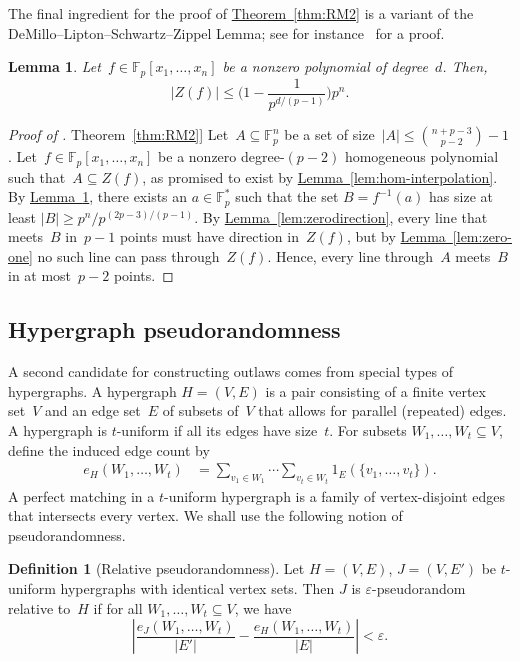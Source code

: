 \documentclass[11pt]{article}
\numberwithin{equation}{section}
\newtheorem{lemma}[theorem]{Lemma}
\theoremstyle{definition}
\newtheorem{definition}[theorem]{Definition}
\theoremstyle{plain}
\newcommand{\expref}[2]{\hyperref[#2]{#1~\ref{#2}}}
\newcommand{\eps}{\varepsilon}
\newcommand{\F}{{\mathbb{F}}}
\newcommand{\beq}{\begin{equation}}
\newcommand{\eeq}{\end{equation}}
\newcommand{\beqn}{\begin{equation*}}
\newcommand{\eeqn}{\end{equation*}}
\begin{document}
The final ingredient for the proof of \expref{Theorem}{thm:RM2} is a variant of the DeMillo--Lipton--Schwartz--Zippel Lemma; see for instance~\cite[Appendix~C]{CohenTal:2014} for a proof.

\begin{lemma}\label{lem:DMLSZ}
Let~$f\in\F_p[x_1,\dots,x_n]$ be a nonzero polynomial of degree~$d$.
Then,
\beqn
|Z(f)| \leq \Big(1 - \frac{1}{p^{d/(p-1)}}\Big)p^n.
\eeqn
\end{lemma}


\begin{proof}[Proof of \expref{Theorem}{thm:RM2}]
Let~$A\subseteq \F_p^n$ be a set of size~$|A|\leq \binom{n+p-3}{p-2}-1$.
Let~$f\in\F_p[x_1,\dots,x_n]$ be a nonzero degree-$(p-2)$ homogeneous polynomial such that~$A\subseteq Z(f)$, as promised to exist by \expref{Lemma}{lem:hom-interpolation}.
By \expref{Lemma}{lem:DMLSZ}, there exists an $a\in\F_p^*$ such that the set $B = f^{-1}(a)$ has size at least $|B| \geq p^n/p^{(2p - 3)/(p-1)}$.
By \expref{Lemma}{lem:zerodirection}, every line that meets~$B$ in~$p-1$ points must have direction in~$Z(f)$, but by \expref{Lemma}{lem:zero-one} no such line can pass through~$Z(f)$.
Hence, every line through~$A$ meets~$B$ in at most~$p-2$ points.
\end{proof}


%
\subsection{Hypergraph pseudorandomness}
\label{sec:ARLDCs}

A second candidate for constructing outlaws comes from special types of hypergraphs.
A hypergraph $H = (V,E)$ is a pair consisting of a finite vertex set~$V$ and an edge set~$E$ of subsets of~$V$ that allows for parallel (repeated) edges.
A hypergraph is $t$-uniform if all its edges have size~$t$.
For  subsets $W_1,\dots,W_t\subseteq V$,  define the induced edge count by
\begin{align*}
e_H(W_1,\dots,W_t)
&=
\sum_{v_1\in W_1}\cdots \sum_{v_t\in W_t} 
1_E(\{v_1,\dots,v_t\}).
\end{align*}
A perfect matching in a $t$-uniform hypergraph is a family of vertex-disjoint edges that intersects every vertex.
We shall use the following notion of pseudorandomness.

\begin{definition}[Relative pseudorandomness]
Let $H = (V,E)$, $J = (V, E')$ be $t$-uniform hypergraphs with identical vertex sets.
Then $J$ is $\eps$-pseudorandom relative to~$H$ if for all $W_1,\dots,W_t\subseteq V$, we have
\beq\label{eq:relqr}
\left|
\frac{e_J(W_1,\dots,W_t)}{|E'|} - \frac{e_H(W_1,\dots,W_t)}{|E|}
\right|
< \eps.
\eeq
\end{definition}
\end{document}

